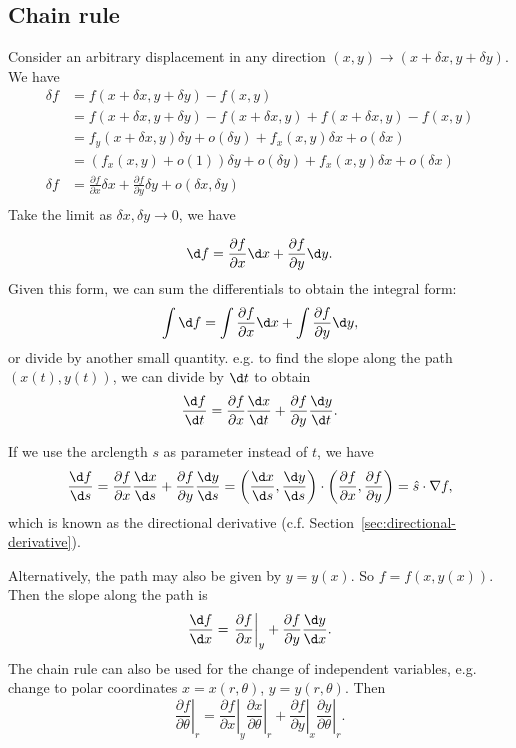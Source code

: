 \documentclass[a4paper]{article}
\begin{document}
\subsection{Chain rule}
Consider an arbitrary displacement in any direction $(x, y) \to (x+\delta x, y + \delta y)$. We have
\begin{align*}
  \delta f &= f(x+\delta x, y + \delta y) - f(x, y)\\
  &= f(x+\delta x, y + \delta y) - f(x + \delta x, y) + f(x+\delta x, y) - f(x, y)\\
  &= f_y(x + \delta x, y)\delta y + o(\delta y) + f_x(x, y)\delta x + o(\delta x)\\
  &= (f_x(x, y) + o(1))\delta y + o(\delta y) + f_x(x, y)\delta x + o(\delta x)\\
  \delta f&= \frac{\partial f}{\partial x}\delta x + \frac{\partial f}{\partial y}\delta y + o(\delta x, \delta y)\\
\end{align*}
Take the limit as $\delta x, \delta y \to 0$, we have 
\begin{thm}
  \[
  \d f = \frac{\partial f}{\partial x}\d x + \frac{\partial f}{\partial y}\d y.
  \]
  Given this form, we can sum the differentials to obtain the integral form:
  \[
  \int \d f = \int \frac{\partial f}{\partial x}\d x + \int \frac{\partial f}{\partial y}\d y,
  \]
  or divide by another small quantity. e.g. to find the slope along the path $(x(t), y(t))$, we can divide by $\d t$ to obtain
  \[
  \frac{\d f}{\d t} = \frac{\partial f}{\partial x}\frac{\d x}{\d t} + \frac{\partial f}{\partial y}\frac{\d y}{\d t}.
  \]
\end{thm}

If we use the arclength $s$ as parameter instead of $t$, we have 
\[
\frac{\d f}{\d s} = \frac{\partial f}{\partial x}\frac{\d x}{\d s} + \frac{\partial f}{\partial y}\frac{\d y}{\d s} = \left(\frac{\d x}{\d s}, \frac{\d y}{\d s}\right)\cdot \left(\frac{\partial f}{\partial x}, \frac{\partial f}{\partial y}\right) = \hat{s}\cdot \nabla f,
\]
which is known as the directional derivative (c.f. Section~\ref{sec:directional-derivative}).

Alternatively, the path may also be given by $y = y(x)$. So $f = f(x, y(x))$. Then the slope along the path is
\[
\frac{\d f}{\d x} = \left.\frac{\partial f}{\partial x}\right|_y + \frac{\partial f}{\partial y}{\frac{\d y}{\d x}}.
\]
The chain rule can also be used for the change of independent variables, e.g. change to polar coordinates $x = x(r, \theta)$, $y = y(r, \theta)$. Then 
\[
\left.\frac{\partial f}{\partial \theta}\right|_r = \left. \frac{\partial f}{\partial x}\right|_y \left.\frac{\partial x}{\partial \theta}\right|_r + \left.\frac{\partial f}{\partial y}\right|_x\left.\frac{\partial y}{\partial \theta}\right|_r.
\]
\end{document}
